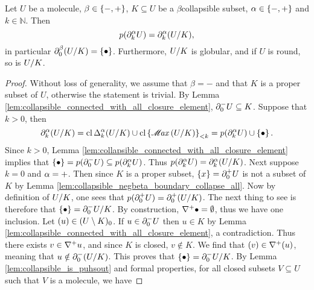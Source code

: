 \begin{lem} \label{lem:collapsible_mapcoll_preserve_boundaries}
    Let \( U \) be a molecule, \( \beta \in \set{-, +} \), \( K \subseteq U \) be a \( \beta \)\nbd collapsible subset, \( \a \in \set{-, +} \) and \( k \in \mathbb{N} \).
    Then 
    \begin{equation*}
        \mapcoll (\bd{k}{\a} U) = \bd{k}{\a} (\coll{K}{U}),
    \end{equation*}
    in particular \( \bd{0}{\beta} (\coll{K}{U}) = \set{\zcoll} \).
    Furthermore, \( \coll{K}{U} \) is globular, and if \( U \) is round, so is \( \coll{K}{U} \).
\end{lem}
\begin{proof}
    Without loss of generality, we assume that \( \beta = - \) and that \( K \) is a proper subset of \( U \), otherwise the statement is trivial.
    By Lemma \ref{lem:collapsible_connected_with_all_closure_element}, \( \bd{0}{-} U \subseteq K \).
    Suppose that \( k > 0 \), then
    \begin{equation*}
        \bd{k}{\a} (\coll{K}{U}) = \clos \faces{k}{\a} (\coll{K}{U}) \cup \gr{< k}{\clset{\maxel (\coll{K}{U})}} = \mapcoll(\bd{k}{\a} U) \cup \set{\zcoll}.
    \end{equation*}
    Since \( k > 0 \), Lemma \ref{lem:collapsible_connected_with_all_closure_element} implies that \( \set{\zcoll} = p(\bd{0}{-} U) \subseteq p(\bd{k}{\a} U) \).
    Thus \(  \mapcoll (\bd{k}{\a} U) = \bd{k}{\a} (\coll{K}{U}) \).
    Next suppose \( k = 0 \) and \( \a = + \).
    Then since \( K \) is a proper subset, \( \set{x} = \bd{0}{+} U \) is not a subset of \( K \) by Lemma \ref{lem:collapsible_negbeta_boundary_collapse_all}. 
    Now by definition of \( \coll{K}{U} \), one sees that \( \mapcoll (\bd{0}{+} U) = \bd{0}{+} (\coll{K}{U}) \).
    The next thing to see is therefore that \( \set{\zcoll} = \bd{0}{-} \coll{K}{U} \).
    By construction, \( \cofaces{}{+} \zcoll = \emptyset \), thus we have one inclusion.
    Let \( \icoll{u} \in \gr{0}{(U \setminus K)} \).
    If \( u \in \bd{0}{-} U \) then \( u \in K \) by Lemma \ref{lem:collapsible_connected_with_all_closure_element}, a contradiction.
    Thus there exists \( v \in \cofaces{}{+} u \), and since \( K \) is closed, \( v \notin K \).
    We find that \( \icoll{v} \in \cofaces{}{+} \icoll{u} \), meaning that \( u \notin \bd{0}{-} (\coll{K}{U}) \).
    This proves that \( \set{\zcoll} = \bd{0}{-} \coll{K}{U} \).
    By Lemma \ref{lem:collapsible_is_puhsout} and formal properties, for all closed subsets \( V \subseteq U \) such that \( V \) is a molecule, we have 

\end{proof}
